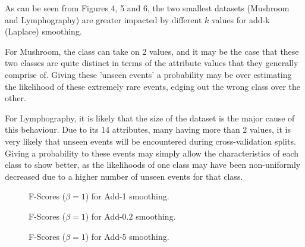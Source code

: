 \documentclass[11pt]{article}
\begin{document}
    As can be seen from Figures 4, 5 and 6, the two smallest datasets (Mushroom and Lymphography) are greater impacted by different $k$ values for add-k (Laplace) smoothing.

    For Mushroom, the class can take on 2 values, and it may be the case that these two classes are quite distinct in terms of the attribute values that they generally comprise of.
    Giving these 'unseen events' a probability may be over estimating the likelihood of these extremely rare events, edging out the wrong class over the other.

    For Lymphography, it is likely that the size of the dataset is the major cause of this behaviour. Due to its 14 attributes, many having more than 2 values, it is very likely that unseen events
    will be encountered during cross-validation splits. Giving a probability to these events may simply allow the characteristics of each class to show better, as the likelihoods of one class may have been non-uniformly decreased due to a higher number of unseen events for that class.
    \begin{figure}[H]
        \centering
        \def\svgwidth{\columnwidth}
        \fbox{\scalebox{0.8}{}}
        \caption{F-Scores ($\beta = 1$) for Add-1 smoothing.}
        \label{fig:q5-add-1}
    \end{figure}
    \begin{figure}[H]
        \centering
        \def\svgwidth{\columnwidth}
        \fbox{\scalebox{0.8}{}}
        \caption{F-Scores ($\beta = 1$) for Add-0.2 smoothing.}
        \label{fig:q5-add-0.2}
    \end{figure}
    \begin{figure}[H]
        \centering
        \def\svgwidth{\columnwidth}
        \fbox{\scalebox{0.8}{}}
        \caption{F-Scores ($\beta = 1$) for Add-5 smoothing.}
        \label{fig:q5-add-5}
    \end{figure}
\end{document}
